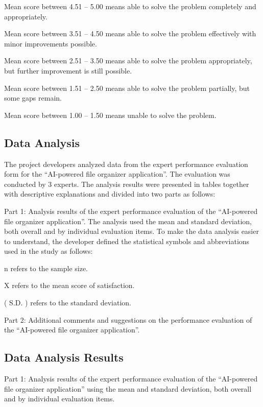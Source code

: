 \documentclass[12pt,oneside,openright,a4paper]{cpe-english-project}
\begin{document}
\vspace{1em}

Mean score between 4.51 -- 5.00 means able to solve the problem completely and appropriately.

Mean score between 3.51 -- 4.50 means able to solve the problem effectively with minor improvements possible.

Mean score between 2.51 -- 3.50 means able to solve the problem appropriately, but further improvement is still possible.

Mean score between 1.51 -- 2.50 means able to solve the problem partially, but some gaps remain.

Mean score between 1.00 -- 1.50 means unable to solve the problem.

\subsection*{Data Analysis}
The project developers analyzed data from the expert performance evaluation form for the ``AI-powered file organizer application''. The evaluation was conducted by 3 experts. The analysis results were presented in tables together with descriptive explanations and divided into two parts as follows:

Part 1: Analysis results of the expert performance evaluation of the ``AI-powered file organizer application''. The analysis used the mean and standard deviation, both overall and by individual evaluation items. To make the data analysis easier to understand, the developer defined the statistical symbols and abbreviations used in the study as follows:

\noindent\hspace*{0.6in} n refers to the sample size.

\noindent\hspace*{0.6in} X refers to the mean score of satisfaction.

\noindent\hspace*{0.6in} ( S.D. ) refers to the standard deviation.

Part 2: Additional comments and suggestions on the performance evaluation of the ``AI-powered file organizer application''.

\subsection*{Data Analysis Results}
Part 1: Analysis results of the expert performance evaluation of the ``AI-powered file organizer application'' using the mean and standard deviation, both overall and by individual evaluation items.
\end{document}
